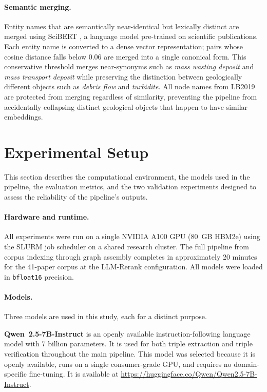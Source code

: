 \documentclass[10pt]{article}
\begin{document}
\paragraph{Semantic merging.}
Entity names that are semantically near-identical but
lexically distinct are merged using SciBERT
\citep{beltagy2019scibertpretrainedlanguagemodel}, a language
model pre-trained on scientific publications.
Each entity name is converted to a dense vector
representation; pairs whose cosine distance falls below 0.06
are merged into a single canonical form.
This conservative threshold merges near-synonyms such as
\emph{mass wasting deposit} and \emph{mass transport deposit}
while preserving the distinction between geologically
different objects such as \emph{debris flow} and
\emph{turbidite}.
All node names from LB2019 are protected from merging
regardless of similarity, preventing the pipeline from
accidentally collapsing distinct geological objects that
happen to have similar embeddings.
\section{Experimental Setup}
\label{sec:setup}

This section describes the computational environment, the models
used in the pipeline, the evaluation metrics, and the two
validation experiments designed to assess the reliability of the
pipeline's outputs.

\paragraph{Hardware and runtime.}

All experiments were run on a single NVIDIA A100 GPU (80~GB
HBM2e) using the SLURM job scheduler on a shared research
cluster.
The full pipeline from corpus indexing through graph assembly
completes in approximately 20 minutes for the 41-paper corpus
at the LLM-Rerank configuration.
All models were loaded in \texttt{bfloat16} precision.

\paragraph{Models.}

Three models are used in this study, each for a distinct
purpose.

\textbf{Qwen~2.5-7B-Instruct} \citep{yang2024qwen2technicalreport}
is an openly available instruction-following language model with
7 billion parameters.
It is used for both triple extraction and triple verification
throughout the main pipeline.
This model was selected because it is openly available, runs
on a single consumer-grade GPU, and requires no domain-specific
fine-tuning.
It is available at
\url{https://huggingface.co/Qwen/Qwen2.5-7B-Instruct}.
\end{document}
